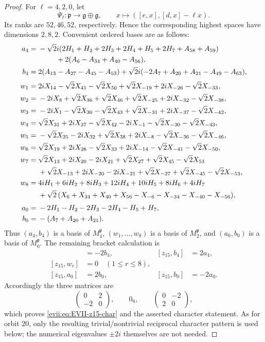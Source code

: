 \documentclass[11pt,reqno]{amsart}
\numberwithin{equation}{section}
\theoremstyle{definition}
\theoremstyle{remark}
\newcommand{\fg}{\mathfrak g}
\newcommand{\fp}{\mathfrak p}
\begin{document}
\begin{proof}
For $\ell=4,2,0$, let
\[
 \Psi_\ell:\fp\longrightarrow\fg\oplus\fg,
 \qquad x\longmapsto([e,x],[d,x]-\ell x).
\]
Its ranks are $52,46,52$, respectively.  Hence the corresponding highest
spaces have dimensions $2,8,2$.  Convenient ordered bases are as follows:
\begingroup
\small
\begin{align*}
 a_4={}&-\sqrt2i(2H_1+H_2+2H_3+2H_4+H_5+2H_7+A_{58}+A_{59})\\
 &\hspace{2.5em}+2(A_6-A_{34}+A_{40}-A_{56}),\\
 b_4={}&2(A_{13}-A_{27}-A_{45}-A_{53})
 +\sqrt2i(-2A_7+A_{20}+A_{21}-A_{49}-A_{63}),\\[1mm]
 w_1={}&2iX_{14}-\sqrt2X_{41}-\sqrt2X_{50}
       +\sqrt2X_{-19}+2iX_{-26}-\sqrt2X_{-33},\\
 w_2={}&-2iX_8+\sqrt2X_{36}+\sqrt2X_{46}
       +\sqrt2X_{-25}+2iX_{-32}-\sqrt2X_{-38},\\
 w_3={}&-2iX_1-\sqrt2X_{30}-\sqrt2X_{43}
       +\sqrt2X_{-31}+2iX_{-37}-\sqrt2X_{-42},\\
 w_4={}&\sqrt2X_{31}+2iX_{37}-\sqrt2X_{42}
       -2iX_{-1}-\sqrt2X_{-30}-\sqrt2X_{-43},\\
 w_5={}&-\sqrt2X_{25}-2iX_{32}+\sqrt2X_{38}
       +2iX_{-8}-\sqrt2X_{-36}-\sqrt2X_{-46},\\
 w_6={}&\sqrt2X_{19}+2iX_{26}-\sqrt2X_{33}
       +2iX_{-14}-\sqrt2X_{-41}-\sqrt2X_{-50},\\
 w_7={}&\sqrt2X_{13}+2iX_{20}-2iX_{21}+\sqrt2X_{27}
       +\sqrt2X_{45}-\sqrt2X_{53}\\
 &+\sqrt2X_{-13}+2iX_{-20}-2iX_{-21}+\sqrt2X_{-27}
       +\sqrt2X_{-45}-\sqrt2X_{-53},\\
 w_8={}&4iH_1+6iH_2+8iH_3+12iH_4+10iH_5+8iH_6+4iH_7\\
 &+\sqrt2\,(X_6+X_{34}+X_{40}+X_{56}
          -X_{-6}-X_{-34}-X_{-40}-X_{-56}),\\[1mm]
 a_0={}&-2H_1-H_2-2H_3-2H_4-H_5+H_7,\\
 b_0={}&-(A_7+A_{20}+A_{21}).
\end{align*}
\endgroup
Thus $(a_4,b_4)$ is a basis of $M_4^{\fp}$,
$(w_1,\ldots,w_8)$ is a basis of $M_2^{\fp}$, and $(a_0,b_0)$ is a basis
of $M_0^{\fp}$.  The remaining bracket calculation is
\begin{align*}
 [z_{15},a_4]&=-2b_4,& [z_{15},b_4]&=2a_4,\\
 [z_{15},w_r]&=0\quad(1\leq r\leq8),\\
 [z_{15},a_0]&=2b_0,& [z_{15},b_0]&=-2a_0.
\end{align*}
Accordingly the three matrices are
\[
 \begin{pmatrix}0&2\\-2&0\end{pmatrix},
 \qquad 0_8,
 \qquad
 \begin{pmatrix}0&-2\\2&0\end{pmatrix},
\]
which proves \eqref{evii:eq:EVII-z15-char} and the asserted character
statement.  As for orbit $20$, only the resulting trivial/nontrivial reciprocal
character pattern is used below; the numerical eigenvalues $\pm2i$ themselves
are not needed.
\end{proof}
\end{document}
